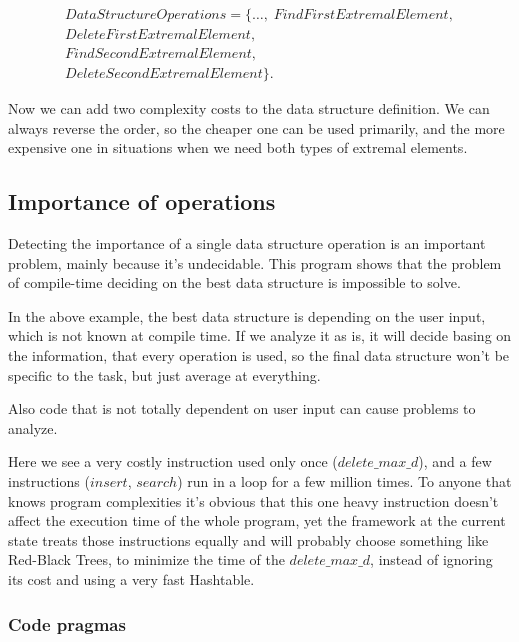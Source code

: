 \documentclass[11pt]{article}
\begin{document}
		\begin{eqnarray*}
			DataStructureOperations = \{\dots, \; FindFirstExtremalElement,\\
			DeleteFirstExtremalElement,\\
			FindSecondExtremalElement,\\
			DeleteSecondExtremalElement\}.
		\end{eqnarray*}

		Now we can add two complexity costs to the data structure definition. We can always reverse the order,
		so the cheaper one can be used primarily, and the more expensive one in situations when we need both
		types of extremal elements.

	\subsection{Importance of operations}

		Detecting the importance of a single data structure operation is an important problem,
		mainly because it's undecidable. This program shows that the problem of compile-time deciding on the
		best data structure is impossible to solve.

		

		In the above example, the best data structure is depending on the user input, which is not known at
		compile time. If we analyze it as is, it will decide basing on the information, that every operation is
		used, so the final data structure won't be specific to the task, but just average at everything.

		Also code that is not totally dependent on user input can cause problems to analyze.

		

		Here we see a very costly instruction used only once ($delete\_max\_d$), and a few instructions
		($insert$, $search$) run in a loop for a few million times.  To anyone that knows program complexities
		it's obvious that this one heavy instruction doesn't affect the execution time of the whole program, yet
		the framework at the current state treats those instructions equally and will probably choose something
		like Red-Black Trees, to minimize the time of the $delete\_max\_d$, instead of ignoring its cost and
		using a very fast Hashtable.

		\subsubsection{Code pragmas}
\end{document}
